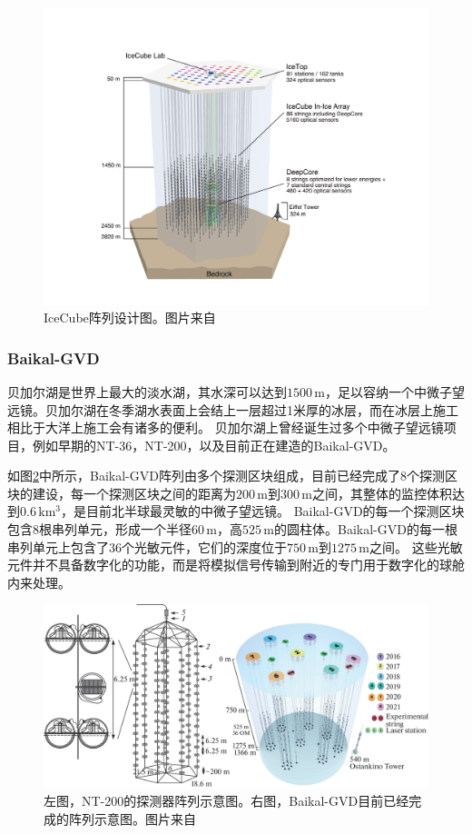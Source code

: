 \begin{figure}[htb]
    \centering
    \includegraphics[width=0.8\linewidth]{img/IceCube_array.pdf}
    \caption{IceCube阵列设计图。图片来自\cite{IceCube_detector:2016}}
    \label{fig:IceCube_array}
\end{figure}

\subsubsection*{Baikal-GVD}

贝加尔湖是世界上最大的淡水湖，其水深可以达到$1500\,\mathrm{m}$，足以容纳一个中微子望远镜。贝加尔湖在冬季湖水表面上会结上一层超过1米厚的冰层，而在冰层上施工相比于大洋上施工会有诸多的便利。
贝加尔湖上曾经诞生过多个中微子望远镜项目，例如早期的NT-36，NT-200\cite{NT_200:1997}，以及目前正在建造的Baikal-GVD\cite{BAIKAL_design:1997}。

如图\ref{fig:Baikal_scope}中所示，Baikal-GVD阵列由多个探测区块组成，目前已经完成了8个探测区块的建设，每一个探测区块之间的距离为$200\,\mathrm{m}$到$300\,\mathrm{m}$之间，其整体的监控体积达到$0.6\,\mathrm{km^3}$，是目前北半球最灵敏的中微子望远镜。
Baikal-GVD的每一个探测区块包含8根串列单元，形成一个半径$60\,\mathrm{m}$，高$525\,\mathrm{m}$的圆柱体。Baikal-GVD的每一根串列单元上包含了36个光敏元件，它们的深度位于$750\,\mathrm{m}$到$1275\,\mathrm{m}$之间。
这些光敏元件并不具备数字化的功能，而是将模拟信号传输到附近的专门用于数字化的球舱内来处理。

\begin{figure}[htb]
    \centering
    \includegraphics[width=0.8\linewidth]{img/Baikal_scope.jpg}
    \caption{左图，NT-200的探测器阵列示意图。右图，Baikal-GVD目前已经完成的阵列示意图。图片来自\cite{Baikal_status:2022}}
    \label{fig:Baikal_scope}
\end{figure}

